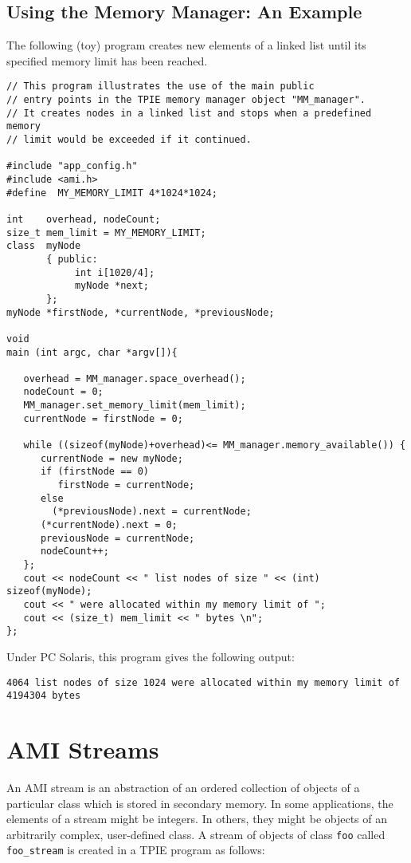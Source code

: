 \subsection{Using the Memory Manager: An Example}

The following (toy) program creates new elements of a linked
list until its specified memory limit has been reached.

\begin{verbatim}
// This program illustrates the use of the main public 
// entry points in the TPIE memory manager object "MM_manager".
// It creates nodes in a linked list and stops when a predefined memory 
// limit would be exceeded if it continued.

#include "app_config.h"
#include <ami.h>
#define  MY_MEMORY_LIMIT 4*1024*1024;

int    overhead, nodeCount;
size_t mem_limit = MY_MEMORY_LIMIT;
class  myNode 
       { public:
            int i[1020/4];
            myNode *next;
       };
myNode *firstNode, *currentNode, *previousNode;

void 
main (int argc, char *argv[]){
 
   overhead = MM_manager.space_overhead();
   nodeCount = 0;
   MM_manager.set_memory_limit(mem_limit);
   currentNode = firstNode = 0;

   while ((sizeof(myNode)+overhead)<= MM_manager.memory_available()) { 
      currentNode = new myNode;
      if (firstNode == 0) 
         firstNode = currentNode;
      else
        (*previousNode).next = currentNode;
      (*currentNode).next = 0;
      previousNode = currentNode;
      nodeCount++;
   };
   cout << nodeCount << " list nodes of size " << (int) sizeof(myNode); 
   cout << " were allocated within my memory limit of ";
   cout << (size_t) mem_limit << " bytes \n";
};
\end{verbatim}

Under PC Solaris, this program gives the following output:
\begin{verbatim}
4064 list nodes of size 1024 were allocated within my memory limit of 4194304 bytes
\end{verbatim}
\section{AMI Streams}
\label{sec:ami_stream-ref}

\tobeextended
{}
An AMI stream is
an abstraction of an ordered collection of objects of a
particular class which is stored in secondary memory.  In some
applications, the elements of a stream might be integers.
In others, they might be objects of an arbitrarily complex, user-defined
class.  A stream of objects of class \verb|foo| called
\verb|foo_stream| is created in a TPIE program as follows:

